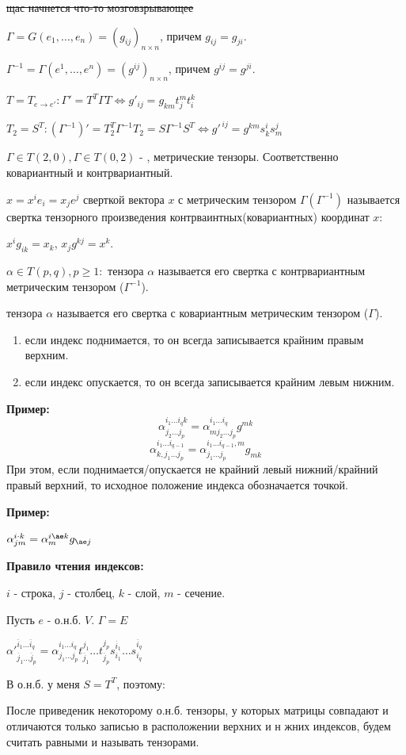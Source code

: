 \sout{щас начнется что-то мозговзрывающее}

$\Gamma = G(e_1,\ldots,e_n)=(g_{ij})_{n \times n}$, причем $g_{ij}=g_{ji}$.

$\Gamma^{-1}= \Gamma (e^1,\ldots, e^n)= (g^{ij})_{n\times n}$, причем $g^{ij} = g^{ji}$.

$T = T_{e\rightarrow e'}: \Gamma' = T^T \Gamma T \Leftrightarrow g'_{ij}= g_{km}t_j^m t_i^k$

$T_2 = S^T: (\Gamma^{-1})' = T_2^T \Gamma^{-1} T_2 = S \Gamma^{-1}S^T \Leftrightarrow g'^{\, ij} = g^{km}s_k^i s_m^j$

 $\Gamma \in T(2,0), \Gamma\in T(0,2)$ - , метрические тензоры. Соответственно ковариантный и контрвариантный.

 $x = x^ie_i = x_j e^j$ сверткой вектора $x$ с метрическим тензором $\Gamma(\Gamma^{-1})$ называется свертка тензорного произведения контрваинтных(ковариантных) координат $x$:

$x^i g_{ik} = x_k$, $x_j g^{kj}= x^k$.

 $\alpha \in T(p,q), p \geq 1:$  тензора $\alpha$ называется его свертка с контрвариантным метрическим тензором ($\Gamma^{-1}$).

 тензора $\alpha$ называется его свертка с ковариантным метрическим тензором ($\Gamma$).

\begin{enumerate}
    \item если индекс поднимается, то он всегда записывается крайним правым верхним.
    \item если индекс опускается, то он всегда записывается крайним левым нижним.
\end{enumerate}

\textbf{Пример:}
$$\alpha_{j_2\ldots j_p}^{i_1\ldots i_qk} = \alpha^{i_1\ldots i_q}_{mj_2\ldots j_p} g^{mk}$$
$$\alpha_{k,j_1\ldots j_p}^{i_1\ldots i_{q-1}} = \alpha^{i_1\ldots i_{q-1},m}_{j_1\ldots j_p} g_{mk}$$
При этом, если поднимается/опускается не крайний левый нижний/крайний правый верхний, то исходное положение индекса обозначается точкой. 

\textbf{Пример:}

$\alpha^{i \cdot k}_{jm} = \alpha^{i \ae k}_m g_{\ae j}$

\textbf{Правило чтения индексов:}

$i$ - строка, $j$ - столбец, $k$ - слой, $m$ - сечение.

Пусть $e$ - о.н.б. $V$. $\Gamma =E$

$\alpha'^{\overline{i}_1\ldots \overline{i}_q}_{\overline{j}_1 \ldots \overline{j}_p} = \alpha^{i_1 \ldots i_q}_{j_1\ldots j_p} t_{\overline{j}_1}^{j_1}\ldots t_{\overline{j}_p}^{j_p}s_{i_1}^{\overline{i}_1}\ldots s_{i_q}^{\overline{i}_q} $

В о.н.б.  у меня $S = T^T$, поэтому:

После приведеник некоторому о.н.б. тензоры, у которых матрицы совпадают и отличаются только записью в расположении верхних и н жних индексов, будем считать равными и называть  тензорами.